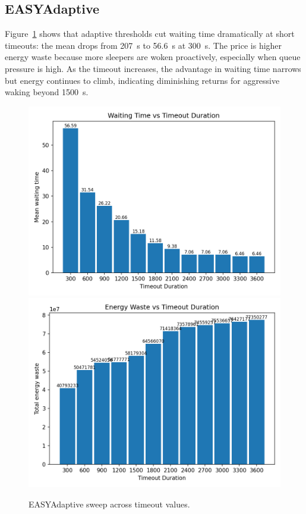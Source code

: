 \documentclass[11pt]{article}
\begin{document}
\subsection{EASYAdaptive}
Figure~\ref{fig:adaptive-plots} shows that adaptive thresholds cut waiting time dramatically at short timeouts: the mean drops from \SI{207}{\second} to \SI{56.6}{\second} at \SI{300}{\second}. The price is higher energy waste because more sleepers are woken proactively, especially when queue pressure is high. As the timeout increases, the advantage in waiting time narrows but energy continues to climb, indicating diminishing returns for aggressive waking beyond \SI{1500}{\second}.

\begin{figure}[h]
  \centering
  \includegraphics[width=\textwidth]{results/easy_adaptive_run/plots/waiting_time_bar.png}\\[0.5\baselineskip]
  \includegraphics[width=\textwidth]{results/easy_adaptive_run/plots/energy_waste_bar.png}
  \caption{EASYAdaptive sweep across timeout values.}
  \label{fig:adaptive-plots}
\end{figure}
\end{document}
